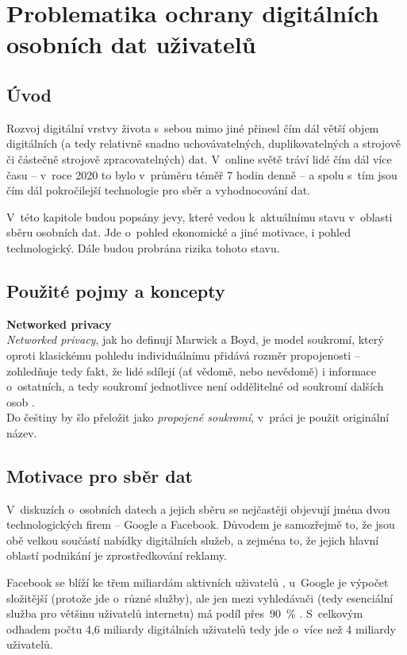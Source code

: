 \chapter{Problematika ochrany digitálních\\ osobních dat uživatelů}

\section*{Úvod}
Rozvoj digitální vrstvy života s~sebou mimo jiné přinesl čím dál větší objem digitálních (a tedy relativně snadno uchovávatelných, duplikovatelných a strojově či částečně strojově zpracovatelných) dat. V~online světě tráví lidé čím dál více času -- v~roce 2020 to bylo v~průměru téměř 7 hodin denně \citep{digital-2021-report} -- a spolu s~tím jsou čím dál pokročilejší technologie pro sběr a vyhodnocování dat.

V~této kapitole budou popsány jevy, které vedou k~aktuálnímu stavu v~oblasti sběru osobních dat.
Jde o~pohled ekonomické a jiné motivace, i pohled technologický.
Dále budou probrána rizika tohoto stavu.

\section*{Použité pojmy a koncepty}

\textbf{Networked privacy}\\
\textit{Networked privacy}, jak ho definují Marwick a Boyd, je model soukromí, který oproti klasickému pohledu individuálnímu přidává rozměr propojenosti -- zohledňuje tedy fakt, že lidé sdílejí (ať vědomě, nebo nevědomě) i informace o~ostatních, a tedy soukromí jednotlivce není oddělitelné od soukromí dalších osob \citep{networked-privacy}.\\
Do češtiny by šlo přeložit jako \textit{propojené soukromí}, v~práci je použit originální název.

\section{Motivace pro sběr dat}

V~diskuzích o~osobních datech a jejich sběru se nejčastěji objevují jména dvou technologických firem -- Google a Facebook. Důvodem je samozřejmě to, že jsou obě velkou součástí nabídky digitálních služeb, a zejména to, že jejich hlavní oblastí podnikání je zprostředkování reklamy.

Facebook se blíží ke třem miliardám aktivních uživatelů \citep{facebook-active-users}, u~Google je výpočet složitější (protože jde o~různé služby), ale jen mezi vyhledávači (tedy esenciální služba pro většinu uživatelů internetu) má podíl přes~90~\% \citep{google-search}. S~celkovým odhadem počtu 4,6 miliardy digitálních uživatelů \citep{digital-2021-report} tedy jde o~více než 4 miliardy uživatelů.

